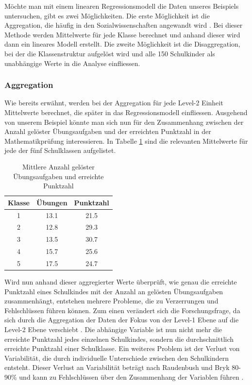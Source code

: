 \documentclass[12pt]{article}\usepackage[]{graphicx}\usepackage[]{color}
\begin{document}
Möchte man mit einem linearen Regressionsmodell die Daten unseres Beispiels untersuchen, gibt es zwei Möglichkeiten. Die erste Möglichkeit ist die Aggregation, die häufig in den Sozialwissenschaften angewandt wird \citep{SnijdersTomA.B2012Ma:a}. Bei dieser Methode werden Mittelwerte für jede Klasse berechnet und anhand dieser wird dann ein lineares Modell erstellt. Die zweite Möglichkeit ist die Disaggregation, bei der die Klassenstruktur aufgelöst wird und alle 150 Schulkinder als unabhängige Werte in die Analyse einfliessen.

\subsubsection{Aggregation}
Wie bereits erwähnt, werden bei der Aggregation für jede Level-2 Einheit Mittelwerte berechnet, die später in das Regressionsmodell einfliessen. Ausgehend von unserem Beispiel könnte man sich nun für den Zusammenhang zwischen der Anzahl gelöster Übungsaufgaben und der erreichten Punktzahl in der Mathematikprüfung interessieren. In Tabelle \ref{tab:aggregation} sind die relevanten Mittelwerte für jede der fünf Schulklassen aufgelistet.

\begin{table}[b]
\centering
\begin{threeparttable}
\caption{Mittlere Anzahl gelöster Übungsaufgaben und erreichte Punktzahl}
\begin{tabular}{ccc}
  \toprule
Klasse & Übungen & Punktzahl \\ 
  \midrule
1 & 13.1 & 21.5 \\ 
2 & 12.8 & 29.3 \\ 
3 & 13.5 & 30.7 \\ 
4 & 15.7 & 25.6 \\ 
5 & 17.5 & 24.7 \\ 
   \bottomrule
\end{tabular}
\label{tab:aggregation}
\end{threeparttable}
\end{table}

Wird nun anhand dieser aggregierter Werte überprüft, wie genau die erreichte Punktzahl eines Schulkindes mit der Anzahl an gelösten Übungsaufgaben zusammenhängt, entstehen mehrere Probleme, die zu Verzerrungen und Fehlschlüssen führen können. Zum einen verändert sich die Forschungsfrage, da sich durch die Aggregation der Daten der Fokus von der Level-1 Ebene auf die Level-2 Ebene verschiebt \citep{SnijdersTomA.B2012Ma:a, woltman2012introduction}. Die abhängige Variable ist nun nicht mehr die erreichte Punktzahl jedes einzelnen Schulkindes, sondern die durchschnittlich erreichte Punktzahl einer Schulklasse. Ein weiteres Problem ist der Verlust von Variabilität, die durch individuelle Unterschiede zwischen den Schulkindern entsteht. Dieser Verlust an Variabilität beträgt nach Raudenbush und Bryk 80-90\% und kann zu Fehlschlüssen über den Zusammenhang der Variablen führen \citep{raudenbush2002hierarchical}. 
\end{document}
